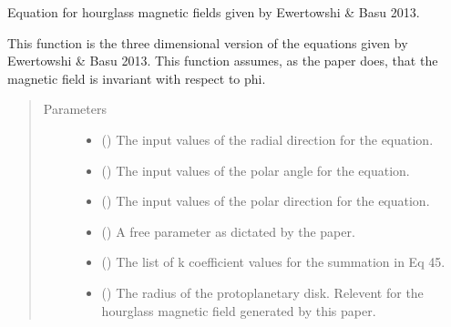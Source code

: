 \documentclass[letterpaper,10pt,english]{sphinxmanual}
\begin{document}
\begin{fulllineitems}
\label{\detokenize{magnetic_field_functions_3d:magnetic_field_functions_3d.hourglass_magnetic_field_cyln_3d}}
Equation for hourglass magnetic fields given by Ewertowshi \& Basu 2013.

This function is the three dimensional version of the equations given by
Ewertowshi \& Basu 2013. This function assumes, as the paper does, that the
magnetic field is invariant with respect to phi.
\begin{quote}\begin{description}
\item[{Parameters}] \leavevmode\begin{itemize}
\item {} 
 () \textendash{} The input values of the radial direction for the equation.

\item {} 
 () \textendash{} The input values of the polar angle for the equation.

\item {} 
 () \textendash{} The input values of the polar direction for the equation.

\item {} 
 () \textendash{} A free parameter as dictated by the paper.

\item {} 
 () \textendash{} The list of k coefficient values for the summation in Eq 45.

\item {} 
 () \textendash{} The radius of the protoplanetary disk. Relevent for the hourglass
magnetic field generated by this paper.


\end{itemize}
\end{description}
\end{quote}
\end{fulllineitems}
\end{document}
